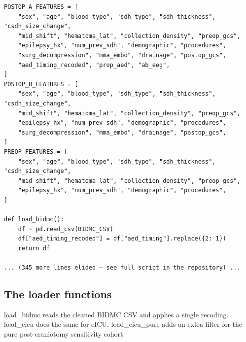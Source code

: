 \documentclass[11pt,a4paper]{article}
\begin{document}
\begin{lstlisting}[style=codeblock]
POSTOP_A_FEATURES = [
    "sex", "age", "blood_type", "sdh_type", "sdh_thickness", "csdh_size_change",
    "mid_shift", "hematoma_lat", "collection_density", "preop_gcs",
    "epilepsy_hx", "num_prev_sdh", "demographic", "procedures",
    "surg_decompression", "mma_embo", "drainage", "postop_gcs",
    "aed_timing_recoded", "prop_aed", "ab_eeg",
]
POSTOP_B_FEATURES = [
    "sex", "age", "blood_type", "sdh_type", "sdh_thickness", "csdh_size_change",
    "mid_shift", "hematoma_lat", "collection_density", "preop_gcs",
    "epilepsy_hx", "num_prev_sdh", "demographic", "procedures",
    "surg_decompression", "mma_embo", "drainage", "postop_gcs",
]
PREOP_FEATURES = [
    "sex", "age", "blood_type", "sdh_type", "sdh_thickness", "csdh_size_change",
    "mid_shift", "hematoma_lat", "collection_density", "preop_gcs",
    "epilepsy_hx", "num_prev_sdh", "demographic", "procedures",
]

def load_bidmc():
    df = pd.read_csv(BIDMC_CSV)
    df["aed_timing_recoded"] = df["aed_timing"].replace({2: 1})
    return df

... (345 more lines elided — see full script in the repository) ...
\end{lstlisting}

\subsection{The loader functions}
load\_bidmc reads the cleaned BIDMC CSV and applies a single recoding. load\_eicu does the same for eICU. load\_eicu\_pure adds an extra filter for the pure post-craniotomy sensitivity cohort.
\end{document}
